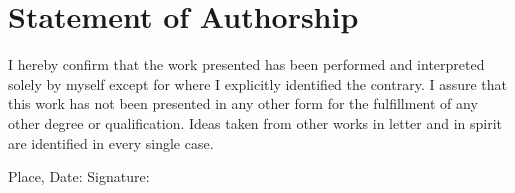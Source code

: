 \documentclass[12pt, a4paper, leqno]{article}
\begin{document}

\newpage
{}  %
\section*{Statement of Authorship}
\thispagestyle{empty}

I hereby confirm that the work presented has been performed and interpreted solely by myself except for where I explicitly identified the contrary. I assure that this work has not been presented in any other form for the fulfillment of any other degree or qualification. Ideas taken from other works in letter and in spirit are identified in every single case.

\vspace{2cm}
\noindent
Place, Date: \underline{\hspace{5cm}} \hfill Signature: \underline{\hspace{5cm}}
\end{document}
